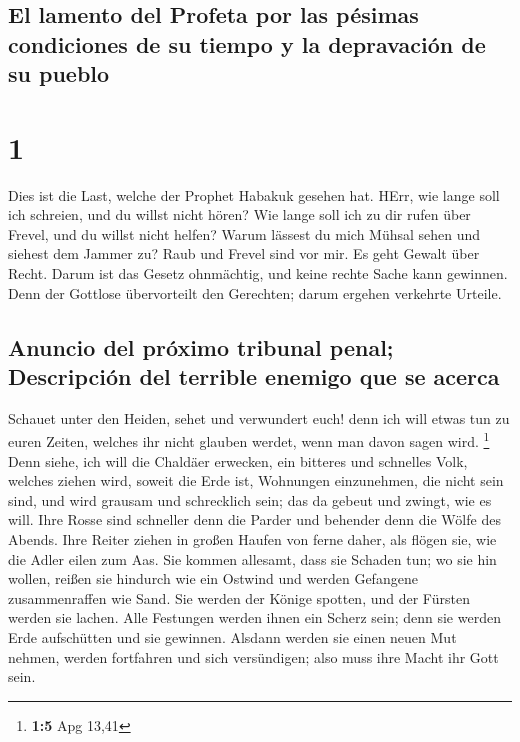 \hypertarget{el-lamento-del-profeta-por-las-puxe9simas-condiciones-de-su-tiempo-y-la-depravaciuxf3n-de-su-pueblo}{%
\subsection{El lamento del Profeta por las pésimas condiciones de su
tiempo y la depravación de su
pueblo}\label{el-lamento-del-profeta-por-las-puxe9simas-condiciones-de-su-tiempo-y-la-depravaciuxf3n-de-su-pueblo}}

\hypertarget{section}{%
\section{1}\label{section}}

 Dies ist die Last, welche der Prophet Habakuk gesehen
hat.  HErr, wie lange soll ich schreien, und du willst
nicht hören? Wie lange soll ich zu dir rufen über Frevel, und du willst
nicht helfen?  Warum lässest du mich Mühsal sehen und
siehest dem Jammer zu? Raub und Frevel sind vor mir. Es geht Gewalt über
Recht.  Darum ist das Gesetz ohnmächtig, und keine rechte
Sache kann gewinnen. Denn der Gottlose übervorteilt den Gerechten; darum
ergehen verkehrte Urteile.

\hypertarget{anuncio-del-pruxf3ximo-tribunal-penal-descripciuxf3n-del-terrible-enemigo-que-se-acerca}{%
\subsection{Anuncio del próximo tribunal penal; Descripción del terrible
enemigo que se
acerca}\label{anuncio-del-pruxf3ximo-tribunal-penal-descripciuxf3n-del-terrible-enemigo-que-se-acerca}}

 Schauet unter den Heiden, sehet und verwundert euch! denn
ich will etwas tun zu euren Zeiten, welches ihr nicht glauben werdet,
wenn man davon sagen wird. \footnote{\textbf{1:5} Apg 13,41}
 Denn siehe, ich will die Chaldäer erwecken, ein bitteres
und schnelles Volk, welches ziehen wird, soweit die Erde ist, Wohnungen
einzunehmen, die nicht sein sind,  und wird grausam und
schrecklich sein; das da gebeut und zwingt, wie es will. 
Ihre Rosse sind schneller denn die Parder und behender denn die Wölfe
des Abends. Ihre Reiter ziehen in großen Haufen von ferne daher, als
flögen sie, wie die Adler eilen zum Aas.  Sie kommen
allesamt, dass sie Schaden tun; wo sie hin wollen, reißen sie hindurch
wie ein Ostwind und werden Gefangene zusammenraffen wie Sand.
 Sie werden der Könige spotten, und der Fürsten werden
sie lachen. Alle Festungen werden ihnen ein Scherz sein; denn sie werden
Erde aufschütten und sie gewinnen.  Alsdann werden sie
einen neuen Mut nehmen, werden fortfahren und sich versündigen; also
muss ihre Macht ihr Gott sein.

